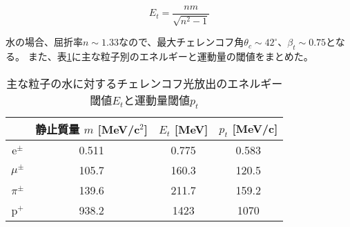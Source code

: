 \documentclass[11pt]{ltjsreport}
\newcommand{\tabref}[1]{表\ref{#1}}
\begin{document}
%

\begin{equation}
E_{t} = \frac{nm}{\sqrt{n^{2}-1}}
\label{EnergyThreshold}
\end{equation}


水の場合、屈折率$n\sim1.33$なので、最大チェレンコフ角$\theta_{c} \sim 42^{\circ}$、$\beta_{t} \sim 0.75$となる。
また、\tabref{ThresholdByParticle}に主な粒子別のエネルギーと運動量の閾値をまとめた。


\begin{table}[htbp]
\caption[主な粒子の水に対するチェレンコフ光放出のエネルギー閾値と運動量閾値]{主な粒子の水に対するチェレンコフ光放出のエネルギー閾値$E_{t}$と運動量閾値$p_{t}$}
\begin{center}
\begin{tabular}{c|ccc}
\hline \hline
& 静止質量 $m$ [MeV/c$^{2}$] & $E_{t}$ [MeV] & $p_{t}$ [MeV/c]\\
 \hline
e$^{\pm}$	& 0.511	& 0.775 & 0.583\\
$\mu^{\pm}$	& 105.7 & 160.3 & 120.5\\
$\pi^{\pm}$	& 139.6 & 211.7 & 159.2 \\
p$^{+}$	& 938.2	& 1423 & 1070\\
\hline \hline
\end{tabular}
\end{center}
\label{ThresholdByParticle}
\end{table}%
\end{document}
